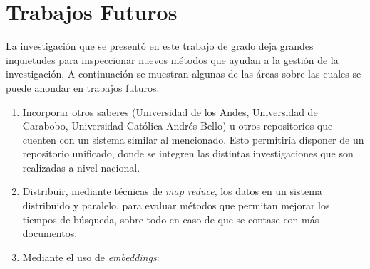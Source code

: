 \documentclass[
  12pt,
  openany]{book}
\begin{document}
\hypertarget{conclusionestrabafutu}{%
\section{Trabajos Futuros}\label{conclusionestrabafutu}}

La investigación que se presentó en este trabajo de grado deja grandes inquietudes para inspeccionar nuevos métodos que ayudan a la gestión de la investigación. A continuación se muestran algunas de las áreas sobre las cuales se puede ahondar en trabajos futuros:

\begin{enumerate}
\def\labelenumi{\arabic{enumi}.}
\item
  Incorporar otros saberes (Universidad de los Andes, Universidad de Carabobo, Universidad Católica Andrés Bello) u otros repositorios que cuenten con un sistema similar al mencionado. Esto permitiría disponer de un repositorio unificado, donde se integren las distintas investigaciones que son realizadas a nivel nacional.
\item
  Distribuir, mediante técnicas de \emph{map reduce}, los datos en un sistema distribuido y paralelo, para evaluar métodos que permitan mejorar los tiempos de búsqueda, sobre todo en caso de que se contase con más documentos.
\item
  Mediante el uso de \emph{embeddings}:


\end{enumerate}
\end{document}
